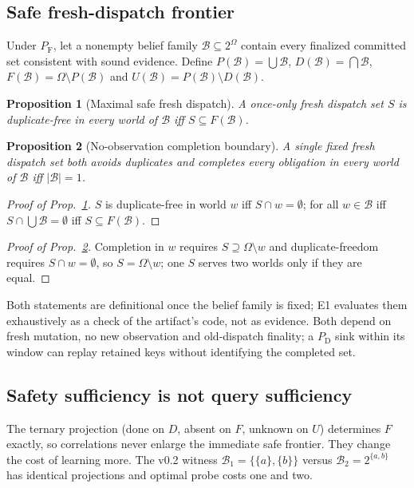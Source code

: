 \documentclass[conference,10pt]{IEEEtran}
\newtheorem{proposition}{Proposition}
\newcommand{\PD}{P_{\mathrm{D}}}
\newcommand{\PF}{P_{\mathrm{F}}}
\newcommand{\Om}{\Omega}
\newcommand{\Bel}{\mathcal{B}}
\begin{document}
\subsection{Safe fresh-dispatch frontier}
Under $\PF$, let a nonempty belief family $\Bel\subseteq 2^{\Om}$ contain every finalized committed set consistent with sound evidence. Define $P(\Bel)=\bigcup\Bel$, $D(\Bel)=\bigcap\Bel$, $F(\Bel)=\Om\setminus P(\Bel)$ and $U(\Bel)=P(\Bel)\setminus D(\Bel)$.
\begin{proposition}[Maximal safe fresh dispatch]\label{prop:frontier}
A once-only fresh dispatch set $S$ is duplicate-free in every world of $\Bel$ iff $S\subseteq F(\Bel)$.
\end{proposition}
\begin{proposition}[No-observation completion boundary]\label{prop:singleton}
A single fixed fresh dispatch set both avoids duplicates and completes every obligation in every world of $\Bel$ iff $|\Bel|=1$.
\end{proposition}
\begin{proof}[Proof of Prop.~\ref{prop:frontier}]
$S$ is duplicate-free in world $w$ iff $S\cap w=\emptyset$; for all $w\in\Bel$ iff $S\cap\bigcup\Bel=\emptyset$ iff $S\subseteq F(\Bel)$.
\end{proof}
\begin{proof}[Proof of Prop.~\ref{prop:singleton}]
Completion in $w$ requires $S\supseteq\Om\setminus w$ and duplicate-freedom requires $S\cap w=\emptyset$, so $S=\Om\setminus w$; one $S$ serves two worlds only if they are equal.
\end{proof}
Both statements are definitional once the belief family is fixed; E1 evaluates them exhaustively as a check of the artifact's code, not as evidence. Both depend on fresh mutation, no new observation and old-dispatch finality; a $\PD$ sink within its window can replay retained keys without identifying the completed set.

\subsection{Safety sufficiency is not query sufficiency}
The ternary projection (done on $D$, absent on $F$, unknown on $U$) determines $F$ exactly, so correlations never enlarge the immediate safe frontier. They change the cost of learning more. The v0.2 witness $\Bel_1=\{\{a\},\{b\}\}$ versus $\Bel_2=2^{\{a,b\}}$ has identical projections and optimal probe costs one and two.
\end{document}
